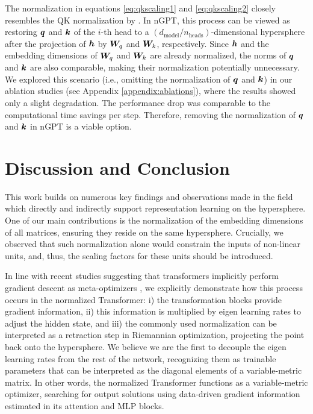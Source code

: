 \documentclass{article} %
\begin{document}
The normalization in equations \ref{eq:qkscaling1} and \ref{eq:qkscaling2} closely resembles the QK normalization by \citet{henry2020query}. In nGPT, this process can be viewed as restoring ${\bm{q}}$ and ${\bm{k}}$ of the $i$-th head to a $(d_{\text{model}}/n_{\text{heads}})$-dimensional hypersphere after the projection of ${\bm{h}}$ by ${\bm{W}}_q$ and ${\bm{W}}_k$, respectively. Since ${\bm{h}}$ and the embedding dimensions of ${\bm{W}}_q$ and ${\bm{W}}_k$ are already normalized, the norms of ${\bm{q}}$ and ${\bm{k}}$ are also comparable, making their normalization potentially unnecessary. We explored this scenario (i.e., omitting the normalization of ${\bm{q}}$ and ${\bm{k}}$) in our ablation studies (see Appendix \ref{appendix:ablations}), where the results showed only a slight degradation. The performance drop was comparable to the computational time savings per step. Therefore, removing the normalization of ${\bm{q}}$ and ${\bm{k}}$ in nGPT is a viable option. 


\section{Discussion and Conclusion}
\label{section_discussionconlclusion}
This work builds on numerous key findings and observations made in the field which directly \citep{wang2020understanding,xu2018spherical,wang2017normface} and indirectly \citep{salimans2016weight, franke2023cpr, kodryan2022training,kosson2023rotational} support representation learning on the hypersphere. One of our main contributions is the normalization of the embedding dimensions of all matrices, ensuring they reside on the same hypersphere. Crucially, we observed that such normalization alone would constrain the inputs of non-linear units, and, thus, the scaling factors for these units should be introduced. 

In line with recent studies suggesting that transformers implicitly perform gradient descent as meta-optimizers \citep{von2023transformers, dai2022can}, we explicitly demonstrate how this process occurs in the normalized Transformer: i) the transformation blocks provide gradient information, ii) this information is multiplied by eigen learning rates to adjust the hidden state, and iii) the commonly used normalization can be interpreted as a retraction step in Riemannian optimization, projecting the point back onto the hypersphere. We believe we are the first to decouple the eigen learning rates from the rest of the network, recognizing them as trainable parameters that can be interpreted as the diagonal elements of a variable-metric matrix. In other words, the normalized Transformer functions as a variable-metric optimizer, searching for output solutions using data-driven gradient information estimated in its attention and MLP blocks. 
\end{document}
